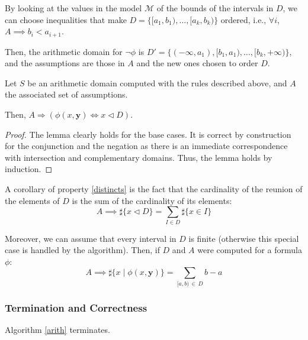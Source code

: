By looking at the values in the model $\mathcal{M}$ of the bounds of the intervals in $D$, we can
choose inequalities that make $D = \{[a_1, b_1), \ldots, [a_k, b_k)\}$ ordered,
i.e., $\forall i$, $A
\implies b_i < a_{i+1}$.

Then, the arithmetic domain for $\lnot \phi$ is $D' = \{(-\infty, a_1), [b_1, a_1), \ldots, [b_k,
+\infty)\}$, and the assumptions are those in $A$ and the new ones chosen to order $D$.


\begin{lemma}[Correctness]

Let $S$ be an arithmetic domain computed with the rules described above, and $A$ the associated set of assumptions.

Then,
$A \Rightarrow \left(\phi(x, \mathbf{y}) \iff x \lhd D\right)$.

\label{correctness-interpretation}

\end{lemma}

\begin{proof}
The lemma clearly holds for the base cases. It is correct by construction for the conjunction and the negation as there is an immediate correspondence with intersection and complementary domains.
Thus, the lemma holds by induction.
\end{proof}




A corollary of property \ref{distincts} is the fact that the cardinality of the reunion of the elements
of $D$ is the sum of the cardinality of its elements:
\begin{equation}
A \implies \sharp\{ x \lhd D \} = \sum\limits_{I \in D} \sharp\{x \in I\}
\end{equation}

Moreover, we can assume that every interval in $D$ is finite (otherwise this
special case is handled by the algorithm). Then, if $D$ and $A$
were computed for a formula $\phi$:
\begin{equation}
A \implies \sharp\{x \mid \phi(x, \mathbf{y})\} = \sum\limits_{[a, b)\, \in\, D} b - a
\end{equation}


\subsubsection{Termination and Correctness}

\begin{lemma}[Termination]

Algorithm \ref{arith} terminates.

\label{termination}

\end{lemma}

